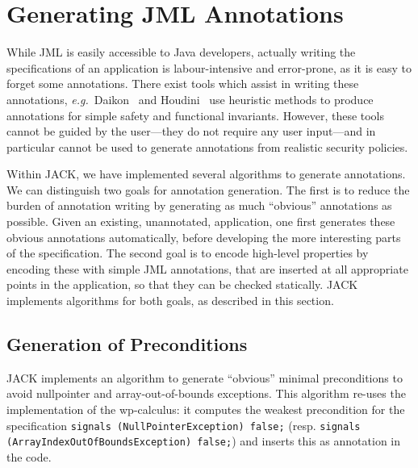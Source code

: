 
\section{Generating JML Annotations}\label{SecAnnotGen}

While JML is easily accessible to Java developers, actually writing
the specifications of an application is labour-intensive and
error-prone, as it is easy to forget some annotations. There exist
tools which assist in writing these annotations,
\emph{e.g.}~Daikon~\cite{ErnstCGN01} and Houdini~\cite{FlanaganL01}
use heuristic methods to produce annotations for simple safety and
functional invariants.  However, these tools cannot be guided by the
user---they do not require any user input---and in particular cannot
be used to generate annotations from realistic security policies.

Within JACK, we have implemented several algorithms to generate
annotations. We can distinguish two goals for annotation
generation. The first is to reduce the burden of annotation writing by
generating as much ``obvious'' annotations as possible. Given an
existing, unannotated, application, one first generates these obvious
annotations automatically, before developing the more interesting
parts of the specification. The second goal is to encode high-level
properties by encoding these with simple JML annotations, that are
inserted at all appropriate points in the application, so that they
can be checked statically.  JACK implements algorithms for both goals,
as described in this section.


\subsection{Generation of Preconditions}


JACK implements an algorithm to generate ``obvious'' minimal
preconditions to avoid nullpointer and array-out-of-bounds
exceptions. This algorithm re-uses the implementation of the
wp-calculus: it computes the weakest precondition for the
specification
\texttt{signals (NullPointerException) false;} (resp. \texttt{signals
(ArrayIndexOutOfBoundsException) false;}) and inserts this as 
annotation in the code.

